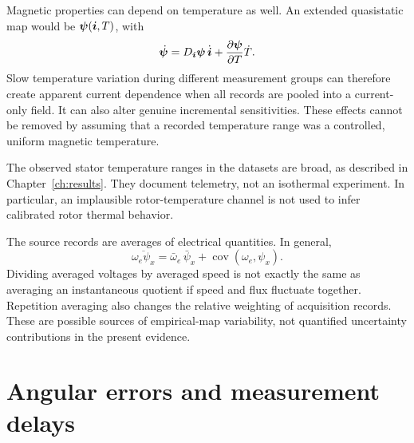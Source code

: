 Magnetic properties can depend on temperature as well. An extended quasistatic map would be $\bm\psi(\bm i,T)$, with
\begin{equation}
\dot{\bm\psi}=D_{\bm i}\bm\psi\,\dot{\bm i}
+\frac{\partial\bm\psi}{\partial T}\dot T.
\end{equation}
Slow temperature variation during different measurement groups can therefore create apparent current dependence when all records are pooled into a current-only field. It can also alter genuine incremental sensitivities. These effects cannot be removed by assuming that a recorded temperature range was a controlled, uniform magnetic temperature.

The observed stator temperature ranges in the datasets are broad, as described in Chapter~\ref{ch:results}. They document telemetry, not an isothermal experiment. In particular, an implausible rotor-temperature channel is not used to infer calibrated rotor thermal behavior.

The source records are averages of electrical quantities. In general,
\begin{equation}
\overline{\omega_e\psi_x}
=\bar\omega_e\,\bar\psi_x+
\operatorname{cov}(\omega_e,\psi_x).
\end{equation}
Dividing averaged voltages by averaged speed is not exactly the same as averaging an instantaneous quotient if speed and flux fluctuate together. Repetition averaging also changes the relative weighting of acquisition records. These are possible sources of empirical-map variability, not quantified uncertainty contributions in the present evidence.

\section{Angular errors and measurement delays}
